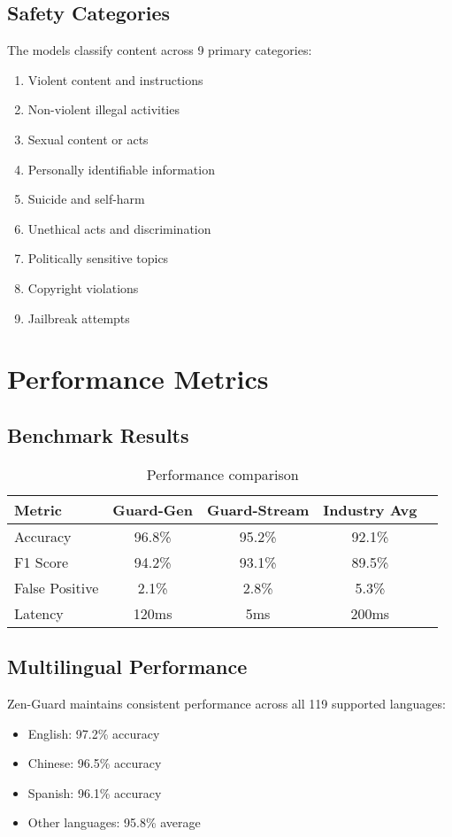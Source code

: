 \documentclass[11pt]{article}
\begin{document}
\subsection{Safety Categories}

The models classify content across 9 primary categories:
\begin{enumerate}
\item Violent content and instructions
\item Non-violent illegal activities
\item Sexual content or acts
\item Personally identifiable information
\item Suicide and self-harm
\item Unethical acts and discrimination
\item Politically sensitive topics
\item Copyright violations
\item Jailbreak attempts
\end{enumerate}

\section{Performance Metrics}

\subsection{Benchmark Results}

\begin{table}[h]
\centering
\begin{tabular}{lcccc}
\toprule
Metric & Guard-Gen & Guard-Stream & Industry Avg \\
\midrule
Accuracy & 96.8\% & 95.2\% & 92.1\% \\
F1 Score & 94.2\% & 93.1\% & 89.5\% \\
False Positive & 2.1\% & 2.8\% & 5.3\% \\
Latency & 120ms & 5ms & 200ms \\
\bottomrule
\end{tabular}
\caption{Performance comparison}
\end{table}

\subsection{Multilingual Performance}

Zen-Guard maintains consistent performance across all 119 supported languages:
\begin{itemize}
\item English: 97.2\% accuracy
\item Chinese: 96.5\% accuracy
\item Spanish: 96.1\% accuracy
\item Other languages: 95.8\% average
\end{itemize}
\end{document}
